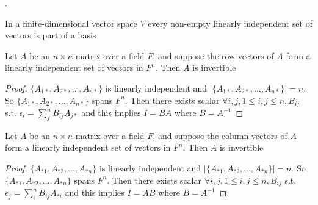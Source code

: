 \documentclass[8pt]{beamer}
\newcommand{\abs}[1]{\left\lvert #1 \right\rvert}
\begin{document}
\begin{frame}{.}
    \begin{corollary}
        In a finite-dimensional vector space $V$ every non-empty linearly independent set of vectors is part of a basis
    \end{corollary}
    \begin{corollary}
        Let $A$ be an $n \times n$ matrix over a field $F$, and suppose the row vectors of $A$ form a linearly independent set of vectors in $F^n$. Then $A$ is invertible
    \end{corollary}
    \begin{proof}
        $\{A_{1*}, A_{2*}, \dots, A_{n*}\}$ is linearly independent and $\abs{\{A_{1*}, A_{2*}, \dots, A_{n*}\}} = n$. So $\{A_{1*}, A_{2*}, \dots, A_{n*}\}$ spans $F^n$.
        Then there exists scalar $\forall i, j, 1 \leq i,j \leq n,B_{ij}$ s.t. $\epsilon_i = \sum_j^n B_{ij} A_{j*}$ and this implies $I = BA$ where $B = A^{-1}$
    \end{proof}
    \begin{corollary}
        Let $A$ be an $n \times n$ matrix over a field $F$, and suppose the column vectors of $A$ form a linearly independent set of vectors in $F^n$. Then $A$ is invertible
    \end{corollary}
    \begin{proof}
        $\{A_{*1}, A_{*2}, \dots, A_{*n}\}$ is linearly independent and $\abs{\{A_{*1}, A_{*2}, \dots, A_{*n}\}} = n$. So $\{A_{*1}, A_{*2}, \dots, A_{*n}\}$ spans $F^n$. Then there exists scalar $ \forall i, j, 1\leq i,j \leq n, B_{ij}$  s.t. $\epsilon_j = \sum_{i}^n B_{ij}A_{*i}$ and this implies $I = AB$ where $B = A^{-1}$
    \end{proof}
\end{frame}
\end{document}
